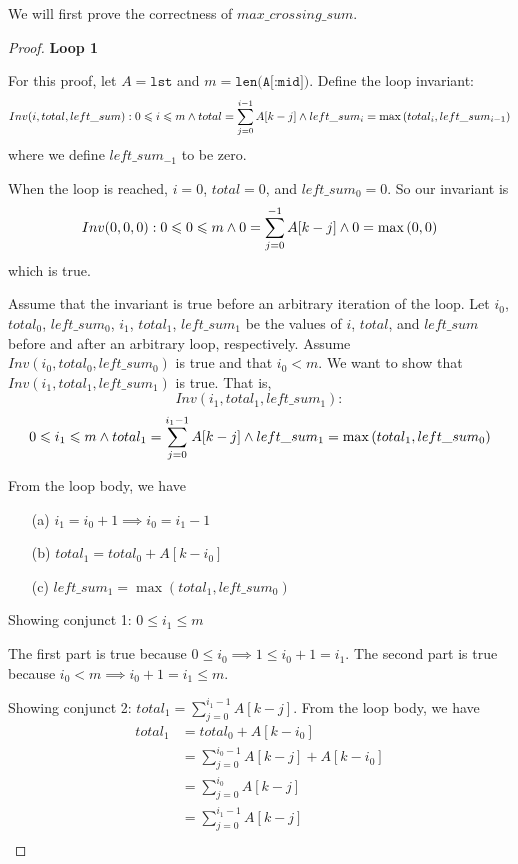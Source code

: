     We will first prove the correctness of $max\_crossing\_sum$.
    \begin{proof}
    \textbf{Loop 1}
    
    For this proof, let $A = \texttt{lst}$ and $m = \texttt{len(A[:mid])}$. 
    Define the loop invariant: 
    $$Inv(i, total, left\_sum): 0 \leqslant i \leqslant m \wedge 
    total = \sum_{j = 0}^{i - 1}A[k - j] 
    \wedge left\_sum_i = \max{(total_i, left\_sum_{i-1})}$$
    where we define $left\_sum_{-1}$ to be zero.
    
    \base
    
    When the loop is reached, $i = 0$, 
    $total = 0$, and $left\_sum_0 = 0$. So our invariant is
    $$Inv(0, 0, 0): 0 \leqslant 0 \leqslant m 
    \wedge 0 = \sum_{j = 0}^{- 1}A[k - j]
    \wedge 0 = \max{(0, 0)}$$
    which is true.
    
    \istep
    
    Assume that the invariant is true before an arbitrary iteration
    of the loop. Let $i_0$, $total_0$, $left\_sum_0$, 
    $i_1$, $total_1$, $left\_sum_1$ be the values of 
    $i$, $total$, and $left\_sum$ before and after an arbitrary loop, 
    respectively.
    Assume
    $Inv(i_0, total_0, left\_sum_0)$ is true and that  $i_0 < m$.
    We want to show that $Inv(i_1, total_1, left\_sum_1)$ is true. That is,
    \[
    Inv(i_1, total_1, left\_sum_1):
    \]
    \[
    0 \leqslant i_1 \leqslant m 
    \wedge total_1 = \sum_{j = 0}^{i_1 - 1}A[k - j]
    \wedge left\_sum_1 = \max{(total_1, left\_sum_0)}
    \]
    
    From the loop body, we have
    \begin{itemize}
        \item [(a)] $i_1 = i_0 + 1 \implies i_0 = i_1 - 1$
        \item [(b)] $total_1 = total_0 + A[k - i_0]$
        \item [(c)] $left\_sum_1 = \max{(total_1, left\_sum_0)}$
    \end{itemize}
    
    \vspace{5mm}
    Showing conjunct 1: $0 \leqslant i_1 \leqslant m$
    
    The first part is true because 
    $0 \leqslant i_0 \implies 1 \leqslant i_0 + 1 = i_1$. The second part
    is true because
    $i_0 < m \implies i_0 + 1 = i_1 \leqslant m$. 
    
    Showing conjunct 2: $total_1 = \sum_{j = 0}^{i_1 - 1}A[k - j]$.
    From the loop body, we have
    \begin{align*}
        total_1 &= total_0 + A[k - i_0] \\
        &= \sum_{j = 0}^{i_0 - 1}A[k - j] + A[k - i_0] \\
        &= \sum_{j = 0}^{i_0}A[k - j] \\
        &= \sum_{j = 0}^{i_1 - 1}A[k - j] \tag{by (a)} \\
    \end{align*}
    

\end{proof}
